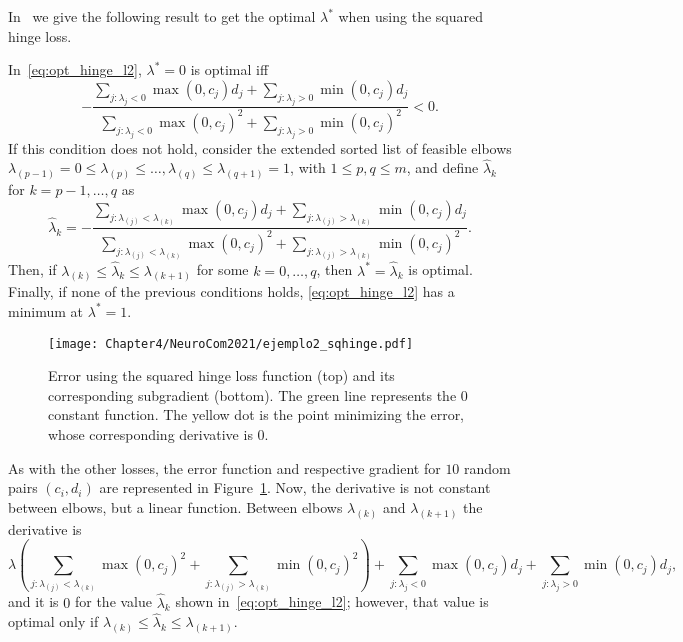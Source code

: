 In~\citet[Proposition 2]{RuizAD21} we give the following result to get the optimal $\lambda^*$ when using the squared hinge loss.
\begin{prop}\label{prop:sqhinge_neurocom2020}
    In~\eqref{eq:opt_hinge_l2},
    $\lambda^*=0$ is optimal iff 
    \begin{equation}\nonumber
         - \frac{\sum_{j: \lambda_{j} < 0} \max(0, c_{j}) d_{j} + \sum_{j: \lambda_{j} > 0} \min(0, c_{j}) d_{j}}{\sum_{j: \lambda_{j} < 0} \max(0, c_{j})^2 + \sum_{j: \lambda_{j} > 0} \min(0, c_{j})^2} < 0.
       \end{equation}
    If this condition does not hold, 
    consider the extended sorted list of feasible elbows $\lambda_{(p-1)} = 0 \leq \lambda_{(p)} \leq \ldots, \lambda_{(q)} \leq \lambda_{(q+1)}=1$, with $1 \leq p, q \leq m$, and
    define $\widehat{\lambda}_k$ for $k=p-1, \ldots,  q$ as %
\begin{equation}\label{sol_hinge_2}
 \widehat{\lambda}_k = - \frac{\sum_{j: \lambda_{(j)} < \lambda_{(k)}} \max(0, c_{j}) d_{j} + \sum_{j: \lambda_{(j)} > \lambda_{(k)}} \min(0, c_{j}) d_{j}}{\sum_{j: \lambda_{(j)} < \lambda_{(k)}} \max(0, c_{j})^2 + \sum_{j: \lambda_{(j)} > \lambda_{(k)}} \min(0, c_{j})^2} .
\end{equation}
%
Then, if $\lambda_{(k)} \leq \widehat{\lambda}_k \leq  \lambda_{(k+1)}$ for some $k=0, \ldots, q$, then $\lambda^* = \widehat{\lambda}_k$ is optimal.
Finally, if none of the previous conditions holds, \eqref{eq:opt_hinge_l2} has a minimum at $\lambda^* = 1$.
\end{prop}
\begin{figure}[t!]
    \centering
    \texttt{[image: Chapter4/NeuroCom2021/ejemplo2\_sqhinge.pdf]}
    \caption{Error using the squared hinge loss function (top) and its corresponding subgradient (bottom). The green line represents the $0$ constant function. The yellow dot is the point minimizing the error, whose corresponding derivative is $0$.}
    \label{fig:sqhinge_error}
\end{figure}

As with the other losses, the error function and respective gradient for $10$ random pairs $(c_i, d_i)$ are represented in Figure~\ref{fig:sqhinge_error}.
Now, the derivative is not constant between elbows, but a linear function. Between elbows $\lambda_{(k)}$ and $\lambda_{(k+1)}$ the derivative is
$$ \lambda \left(\sum_{j: \lambda_{(j)} < \lambda_{(k)}} \max(0, c_{j})^2 + \sum_{j: \lambda_{(j)} > \lambda_{(k)}} \min(0, c_{j})^2 \right) + \sum_{j: \lambda_{j} < 0} \max(0, c_{j}) d_{j} + \sum_{j: \lambda_{j} > 0} \min(0, c_{j}) d_{j}, $$
and it is $0$ for the value $\widehat{\lambda}_k$ shown in~\eqref{eq:opt_hinge_l2}; however, that value is optimal only if $\lambda_{(k)} \leq \widehat{\lambda}_k \leq  \lambda_{(k+1)}$.



